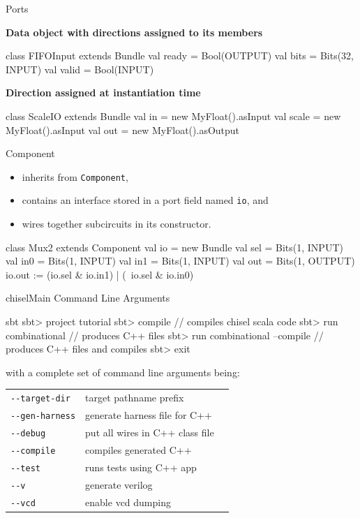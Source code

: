 \documentclass[xcolor=pdflatex,dvipsnames,table]{beamer}
\begin{document}
\begin{frame}[fragile]{Ports}

\textbf{Data object with directions assigned to its members}

\begin{scala}
class FIFOInput extends Bundle {
  val ready = Bool(OUTPUT)
  val bits  = Bits(32, INPUT)
  val valid = Bool(INPUT)
}
\end{scala}

\textbf{Direction assigned at instantiation time}

\begin{scala}
class ScaleIO extends Bundle {
  val in    = new MyFloat().asInput
  val scale = new MyFloat().asInput
  val out   = new MyFloat().asOutput
}
\end{scala}
\end{frame}

\begin{frame}[fragile]{Component}

\begin{itemize}
\item inherits from \verb+Component+,
\item contains an interface stored in a port field named \verb+io+, and
\item wires together subcircuits in its constructor.
\end{itemize}

\begin{scala}
class Mux2 extends Component {
  val io = new Bundle{
    val sel = Bits(1, INPUT)
    val in0 = Bits(1, INPUT)
    val in1 = Bits(1, INPUT)
    val out = Bits(1, OUTPUT)
  }
  io.out := (io.sel & io.in1) | (~io.sel & io.in0)
}
\end{scala}

\end{frame}

\begin{frame}[fragile]{chiselMain Command Line Arguments}
\begin{scala}
sbt 
sbt> project tutorial
sbt> compile                     // compiles chisel scala code
sbt> run combinational           // produces C++ files
sbt> run combinational --compile // produces C++ files and compiles
sbt> exit
\end{scala}

with a complete set of command line arguments being:\\[2mm]

\begin{tabular}{lll}
\verb+--target-dir+ & target pathname prefix \\
\verb+--gen-harness+ & generate harness file for C++ \\
\verb+--debug+ & put all wires in C++ class file \\
\verb+--compile+ & compiles generated C++ \\
\verb+--test+ & runs tests using C++ app \\
\verb+--v+ & generate verilog \\
\verb+--vcd+ & enable vcd dumping \\
\end{tabular}
\end{frame}
\end{document}
